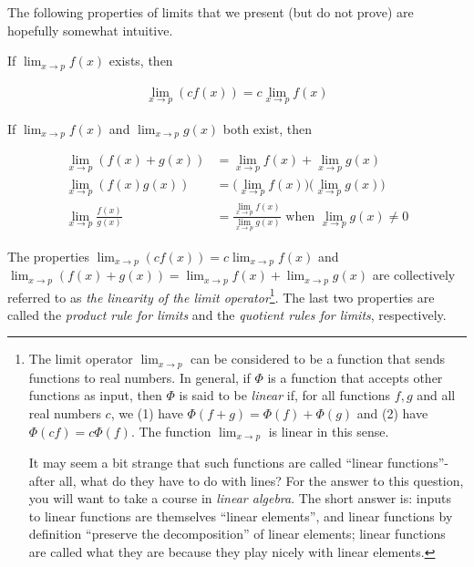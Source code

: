 The following properties of limits that we present (but do not prove) are hopefully somewhat intuitive.

\vspace{.25cm}

If $\lim_{x \rightarrow p} f(x)$ exists, then

\begin{align*}
    \lim_{x \rightarrow p} (c f(x)) = c \lim_{x \rightarrow p} f(x)
\end{align*}

If $\lim_{x \rightarrow p} f(x)$ and $\lim_{x \rightarrow p} g(x)$ both exist, then

\begin{align*}
    \lim_{x \rightarrow p} (f(x) + g(x)) &= \lim_{x \rightarrow p} f(x) + \lim_{x \rightarrow p} g(x) \\
    \lim_{x \rightarrow p} (f(x) g(x)) &= \Big( \lim_{x \rightarrow p} f(x) \Big) \Big( \lim_{x \rightarrow p} g(x) \Big) \\
    \lim_{x \rightarrow p} \frac{f(x)}{g(x)} &= \frac{\lim_{x \rightarrow p} f(x)}{\lim_{x \rightarrow p} g(x)} \text{ when } \lim_{x \rightarrow p} g(x) \neq 0
\end{align*}

The properties $\lim_{x \rightarrow p} (c f(x)) = c \lim_{x \rightarrow p} f(x)$ and $\lim_{x \rightarrow p} (f(x) + g(x)) = \lim_{x \rightarrow p} f(x) + \lim_{x \rightarrow p} g(x)$ are collectively referred to as \textit{the linearity of the limit operator}\footnote{The limit operator $\lim_{x \rightarrow p}$ can be considered to be a function that sends functions to real numbers. In general, if $\Phi$ is a function that accepts other functions as input, then $\Phi$ is said to be \textit{linear} if, for all functions $f, g$ and all real numbers $c$, we (1) have $\Phi(f + g) = \Phi(f) + \Phi(g)$ and (2) have $\Phi(cf) = c\Phi(f)$. The function $\lim_{x \rightarrow p}$ is linear in this sense.

It may seem a bit strange that such functions are called ``linear functions''- after all, what do they have to do with lines? For the answer to this question, you will want to take a course in \textit{linear algebra}. The short answer is: inputs to linear functions are themselves ``linear elements'', and linear functions by definition ``preserve the decomposition'' of linear elements; linear functions are called what they are because they play nicely with linear elements.}. The last two properties are called the \textit{product rule for limits} and the \textit{quotient rules for limits}, respectively.
    
